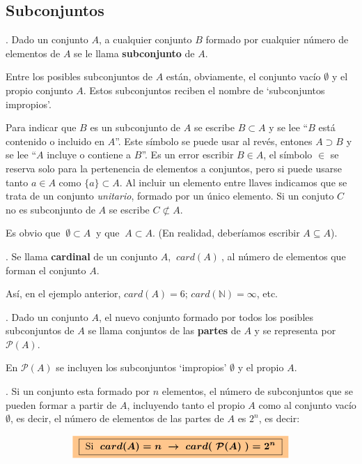 \subsection{Subconjuntos}

\begin{definition}
	. Dado un conjunto $A$, a cualquier conjunto $B$ formado por cualquier número de elementos de $A$	se le llama  \textbf{subconjunto} de $A$.
	
	\vspace{2mm} Entre los posibles subconjuntos de $A$ están, obviamente, el conjunto vacío $\emptyset$ y el propio conjunto $A$. Estos subconjuntos reciben el nombre de `subconjuntos impropios'.

\end{definition}

Para indicar que $B$ es un subconjunto de $A$ se escribe $B \subset A$ y se lee ``$B$ está contenido o incluido en $A$''. Este símbolo se puede usar al revés, entones $A \supset B$ y se lee ``$A$ incluye o contiene a $B$''. Es un error escribir $B\in A$, el símbolo $\in$ se reserva solo para la pertenencia de elementos a conjuntos, pero si puede usarse tanto $a\in A$ como $\{a\}\subset A$. Al incluir un elemento entre llaves indicamos que se trata de un conjunto \emph{unitario}, formado por un único elemento. Si un conjuto $C$ no es subconjunto de $A$ se escribe $C \not\subset A$.

Es obvio que $\ \emptyset \subset A\ $ y que $\ A\subset A$. \textcolor{gris}{(En realidad, deberíamos escribir $A\subseteq A$).}

\begin{definition}
	. Se llama \textbf{cardinal} de un conjunto $A$, $\ card(A)\ $, al número de elementos que forman el conjunto $A$.
	
	Así, en el ejemplo anterior, $card(A)=6$; $card(\mathbb N)=\infty$, etc.
\end{definition}

\begin{definition}
	. Dado un conjunto $A$, el nuevo conjunto formado por todos los posibles subconjuntos de $A$ se llama conjuntos de las \textbf{partes} de $A$ y se representa por $\mathcal P(A)$.
	
	En 	$\mathcal P(A)$ se incluyen los subconjuntos `impropios' $\emptyset$ y el propio $A$.
\end{definition}



\begin{theorem}
	. Si un conjunto esta formado por $n$ elementos, el número de subconjuntos que se pueden formar a partir de $A$, incluyendo tanto el propio $A$ como al conjunto vacío $\emptyset$, es decir, el número de elementos de las partes de $A$ es $2^n$, es decir:
	
	$$\colorbox{orange!45}{ \boxed{ \  \boldsymbol{ \text{Si }\ card(A)=n \ \to \ card(\ \mathcal P(A)\ )	=2^n } \ } }$$
\end{theorem}



